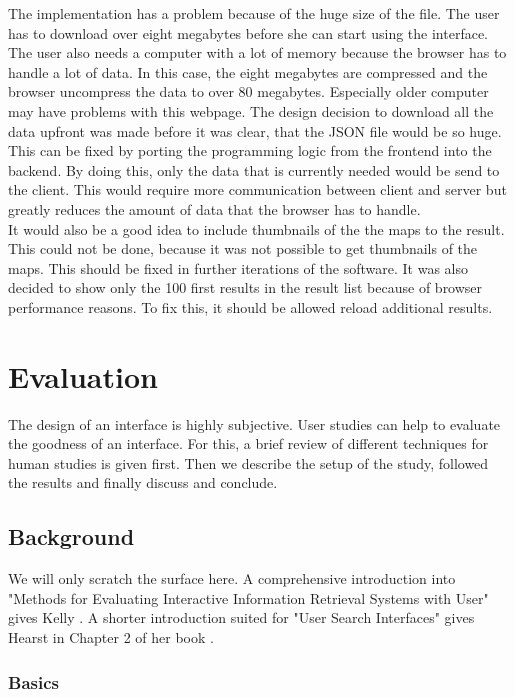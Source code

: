 \documentclass[11pt]{report}
\begin{document}
The implementation has a problem because of the huge size of the  file. The user has to download over eight megabytes before she can start using the interface. The user also needs a computer with a lot of memory because the browser has to handle a lot of data. In this case, the eight megabytes are compressed and the browser uncompress the data to over 80 megabytes. Especially older computer may have problems with this webpage. The design decision to download all the data upfront was made before it was clear, that the JSON file would be so huge. This can be fixed by porting the programming logic from the frontend into the backend. By doing this, only the data that is currently needed would be send to the client. This would require more communication between client and server but greatly reduces the amount of data that the browser has to handle. \\

 It would also be a good idea to include thumbnails of the the maps to the result. This could not be done, because it was not possible to get thumbnails of the maps. This should be fixed in further iterations of the software. It was also decided to show only the 100 first results in the result list because of browser performance reasons. To fix this, it should be allowed reload additional results.

\chapter{Evaluation}
\label{Evaluation}

The design of an interface is highly subjective. User studies can help to evaluate the goodness of an interface. For this, a brief review of different techniques for human studies is given first. Then we describe the setup of the study, followed the results and finally discuss and conclude.

\section{Background}

We will only scratch the surface here. A comprehensive introduction into "Methods for Evaluating Interactive Information Retrieval Systems with User" gives Kelly \cite{Kelly2007}. A shorter introduction suited for "User Search Interfaces" gives Hearst in Chapter 2 of her book \cite{Hearst2009}.

\subsection{Basics}
\end{document}
